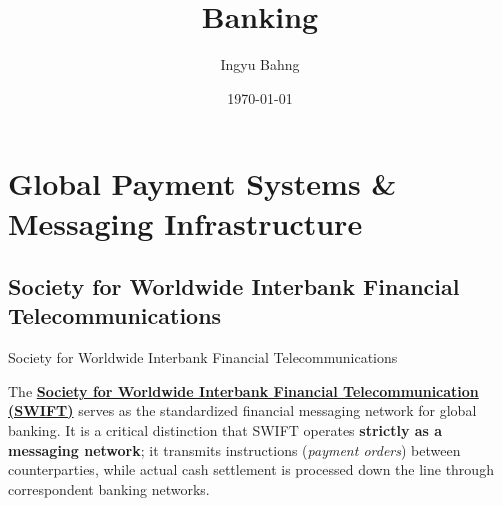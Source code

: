 \documentclass[10pt]{article}
\title{Banking}
\date{\today}
\author{Ingyu Bahng}
\begin{document}


\section{Global Payment Systems \& Messaging Infrastructure}

  \subsection{Society for Worldwide Interbank Financial Telecommunications}

    \begin{core}{Society for Worldwide Interbank Financial Telecommunications}

      The \href{https://www.swift.com/}{\textbf{Society for Worldwide Interbank Financial Telecommunication (SWIFT)}} serves as the standardized financial messaging network for global banking. It is a critical distinction that SWIFT operates \textbf{strictly as a messaging network}; it transmits instructions (\textit{payment orders}) between counterparties, while actual cash settlement is processed down the line through correspondent banking networks. 

    \end{core}
\end{document}
